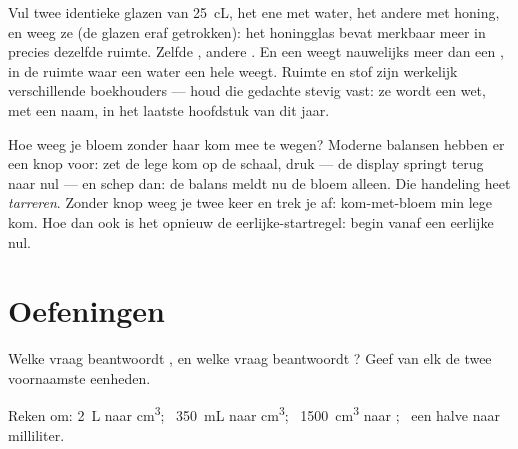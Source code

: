 \begin{example}\label{ex:g6:mass-and-volume:different}
Vul twee identieke glazen van \qty{25}{cL}, het ene met water, het
andere met honing, en weeg ze (de glazen eraf getrokken): het
honingglas bevat merkbaar meer  in precies dezelfde ruimte. Zelfde
, andere . En een   weegt nauwelijks meer
dan een , in de ruimte waar een  water een hele
 weegt. Ruimte en stof zijn werkelijk verschillende
boekhouders --- houd die gedachte stevig vast: ze wordt een wet, met
een naam, in het laatste hoofdstuk van dit jaar.
\end{example}

\begin{remark}\label{rem:g6:mass-and-volume:tare}
Hoe weeg je bloem zonder haar kom mee te wegen? Moderne balansen
hebben er een knop voor: zet de lege kom op de schaal, druk --- de
display springt terug naar nul --- en schep dan: de balans meldt nu de
bloem alleen. Die handeling heet \emph{tarreren}. Zonder knop weeg je
twee keer en trek je af: kom-met-bloem min lege kom. Hoe dan ook is
het opnieuw de eerlijke-startregel: begin vanaf een eerlijke nul.
\end{remark}

\section{Oefeningen}

\begin{exercise}[$\star$]\label{exo:g6:mass-and-volume:1}
Welke vraag beantwoordt , en welke vraag beantwoordt
? Geef van elk de twee voornaamste eenheden.
\end{exercise}

\begin{exercise}[$\star$]\label{exo:g6:mass-and-volume:2}
Reken om: \qty{2}{L} naar \unit{cm^3}; \ \qty{350}{mL} naar
\unit{cm^3}; \ \qty{1500}{cm^3} naar ; \ een halve
 naar milliliter.
\end{exercise}

